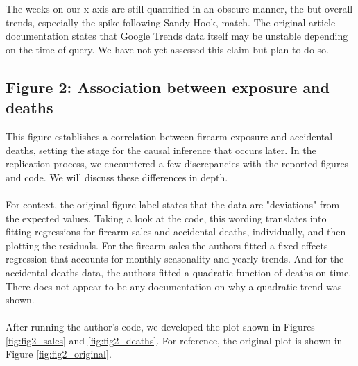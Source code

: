 \documentclass[12pt]{article}%
\begin{document}
The weeks on our x-axis are still quantified in an obscure manner, the but overall trends, especially the spike following Sandy Hook, match. The original article documentation states that Google Trends data itself may be unstable depending on the time of query. We have not yet assessed this claim but plan to do so. 
\subsection*{Figure 2: Association between exposure and deaths}
This figure establishes a correlation between firearm exposure and accidental deaths, setting the stage for the causal inference that occurs later. In the replication process, we encountered a few discrepancies with the reported figures and code. We will discuss these differences in depth. \\ \\
For context, the original figure label states that the data are "deviations" from the expected values. Taking a look at the code, this wording translates into fitting regressions for firearm sales and accidental deaths, individually, and then plotting the residuals. For the firearm sales the authors fitted a fixed effects regression that accounts for monthly seasonality and yearly trends. And for the accidental deaths data, the authors fitted a quadratic function of deaths on time. There does not appear to be any documentation on why a quadratic trend was shown. \\ \\
After running the author's code, we developed the plot shown in Figures \ref{fig:fig2_sales} and \ref{fig:fig2_deaths}. For reference, the original plot is shown in Figure \ref{fig:fig2_original}. 
\end{document}
